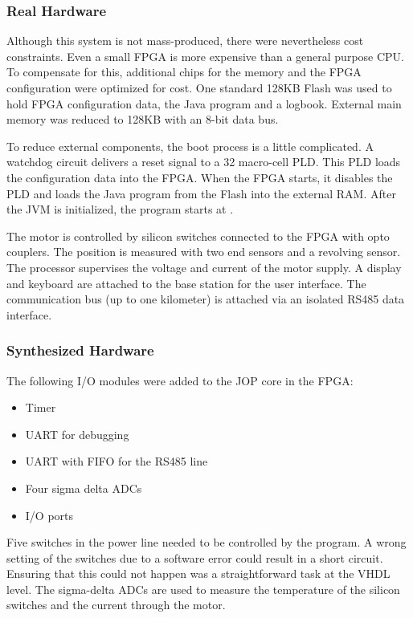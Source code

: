 

\subsubsection{Real Hardware}

Although this system is not mass-produced, there were nevertheless
cost constraints. Even a small FPGA is more expensive than a general
purpose CPU. To compensate for this, additional chips for the memory
and the FPGA configuration were optimized for cost. One standard
128KB Flash was used to hold FPGA configuration data, the Java
program and a logbook. External main memory was reduced to 128KB
with an 8-bit data bus.

To reduce external components, the boot process is a little
complicated. A watchdog circuit delivers a reset signal to a 32
macro-cell PLD. This PLD loads the configuration data into the FPGA.
When the FPGA starts, it disables the PLD and loads the Java program
from the Flash into the external RAM. After the JVM is initialized,
the program starts at .

The motor is controlled by silicon switches connected to the FPGA
with opto couplers. The position is measured with two end sensors and
a revolving sensor. The processor supervises the voltage and current
of the motor supply. A display and keyboard are attached to the base
station for the user interface. The communication bus (up to one
kilometer) is attached via an isolated RS485 data interface.

\subsubsection{Synthesized Hardware}

The following I/O modules were added to the JOP core in the FPGA:
%
\begin{itemize}
\item Timer
\item UART for debugging
\item UART with FIFO for the RS485 line
\item Four sigma delta ADCs
\item I/O ports
\end{itemize}
%
Five switches in the power line needed to be controlled by the
program. A wrong setting of the switches due to a software error
could result in a short circuit. Ensuring that this could not happen
was a straightforward task at the VHDL level. The sigma-delta ADCs
are used to measure the temperature of the silicon switches and the
current through the motor.


